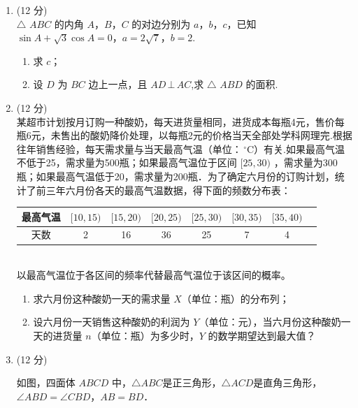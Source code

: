 \documentclass[12pt,twoside,space]{ctexart}
\begin{document}
\begin{enumerate}[itemsep=-0.3em,topsep=0pt,resume]%
\item (12 分)\\
$\triangle$ $ABC$ 的内角 $A$，$B$，$C$ 的对边分别为 $a$，$b$，$c$，已知 $\sin A+\sqrt{3}\cos A=0$，$a=2\sqrt{7}$，$b=2$.
    \begin{enumerate}[itemsep=-0.3em,label={(\arabic*)},topsep=0pt,labelsep=.5em,leftmargin=1.7em]
	\item 求 $c$；
	\item 设 $D$ 为 $BC$ 边上一点，且 $AD\,\bot \,AC$,求 $\triangle$ $ABD$ 的面积.
    \end{enumerate}
\item (12 分)\\
某超市计划按月订购一种酸奶，每天进货量相同，进货成本每瓶4元，售价每瓶6元，未售出的酸奶降价处理，以每瓶2元的价格当天全部处学科网理完.根据往年销售经验，每天需求量与当天最高气温（单位：$\,^{\circ}\mathrm{C}$）有关.如果最高气温不低于25，需求量为500瓶；如果最高气温位于区间 $[25,30)$ ，需求量为300瓶；如果最高气温低于20，需求量为200瓶．为了确定六月份的订购计划，统计了前三年六月份各天的最高气温数据，得下面的频数分布表：\\[-2em]
\begin{table}[htbp]
\centering
\begin{tabular}{|c|c|c|c|c|c|c|c|}\hline
最高气温 & $[10,15)$& $[15,20)$ & $[20,25)$ & $[25,30)$ & $[30,35)$ & $[35,40)$\\\hline
天数     & 2        & 16       &36        &25        &7         &4         \\\hline
\end{tabular}
\end{table}\\[-1em]
以最高气温位于各区间的频率代替最高气温位于该区间的概率。
    \begin{enumerate}[itemsep=-0.3em,label={(\arabic*)},topsep=0pt,labelsep=.5em,leftmargin=1.7em]
	\item 求六月份这种酸奶一天的需求量 $X$（单位：瓶）的分布列；
	\item 设六月份一天销售这种酸奶的利润为 $Y$（单位：元），当六月份这种酸奶一天的进货量 $n$（单位：瓶）为多少时，$Y$ 的数学期望达到最大值？
    \end{enumerate}\newpage
\item (12 分)\\[0.5em] \begin{minipage}[h][20ex][t]{.55\textwidth}
如图，四面体 $ABCD$ 中，$\triangle ABC$是正三角形，$\triangle ACD$是直角三角形，$\angle ABD=\angle CBD$，$AB=BD$．

\end{minipage}
\end{enumerate}
\end{document}

